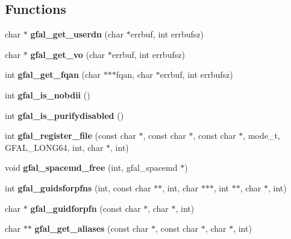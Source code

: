 \subsection*{Functions}
\begin{CompactItemize}
\item 
char $\ast$ \textbf{gfal\_\-get\_\-userdn} (char $\ast$errbuf, int errbufsz)\label{group__internal__group_g6bd6336b0fee1ff32ad6bc5ef3d96068}

\item 
char $\ast$ \textbf{gfal\_\-get\_\-vo} (char $\ast$errbuf, int errbufsz)\label{group__internal__group_g1d7294ee456d16c8b1bf40f97ffb5081}

\item 
int \textbf{gfal\_\-get\_\-fqan} (char $\ast$$\ast$$\ast$fqan, char $\ast$errbuf, int errbufsz)\label{group__internal__group_g54b4e29078838583c8022630ef5a2ed3}

\item 
int \textbf{gfal\_\-is\_\-nobdii} ()\label{group__internal__group_g0d2a0557bdb571ccb85c6ab5c05ae56f}

\item 
int \textbf{gfal\_\-is\_\-purifydisabled} ()\label{group__internal__group_g3a35f0e6f616c5108f95cfffd557db77}

\item 
int \textbf{gfal\_\-register\_\-file} (const char $\ast$, const char $\ast$, const char $\ast$, mode\_\-t, GFAL\_\-LONG64, int, char $\ast$, int)\label{group__internal__group_gdb09f20d086253b45c5d2896be95b4a9}

\item 
void \textbf{gfal\_\-spacemd\_\-free} (int, gfal\_\-spacemd $\ast$)\label{group__internal__group_gb22308fb1cfbade81dddfcf4bedf86da}

\item 
int \textbf{gfal\_\-guidsforpfns} (int, const char $\ast$$\ast$, int, char $\ast$$\ast$$\ast$, int $\ast$$\ast$, char $\ast$, int)\label{group__internal__group_g72f2d9fb6a55816f243a4c57c5369fe5}

\item 
char $\ast$ \textbf{gfal\_\-guidforpfn} (const char $\ast$, char $\ast$, int)\label{group__internal__group_g86568afb8c7f9b0d6944de793a3e867a}

\item 
char $\ast$$\ast$ \textbf{gfal\_\-get\_\-aliases} (const char $\ast$, const char $\ast$, char $\ast$, int)\label{group__internal__group_g25d4ae6bef6570590efbc8548e7d79e2}


\end{CompactItemize}
